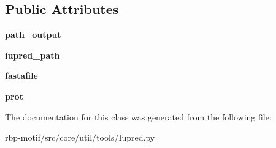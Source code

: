 \subsection*{Public Attributes}
\begin{DoxyCompactItemize}
\item 
\hypertarget{classsrc_1_1core_1_1util_1_1tools_1_1Iupred_1_1Iupred_a2b4d26412ad9a84336800751ce49adb0}{{\bfseries path\-\_\-output}}\label{classsrc_1_1core_1_1util_1_1tools_1_1Iupred_1_1Iupred_a2b4d26412ad9a84336800751ce49adb0}

\item 
\hypertarget{classsrc_1_1core_1_1util_1_1tools_1_1Iupred_1_1Iupred_adf0b98b5d9c54aa5cf1ea28d471c1147}{{\bfseries iupred\-\_\-path}}\label{classsrc_1_1core_1_1util_1_1tools_1_1Iupred_1_1Iupred_adf0b98b5d9c54aa5cf1ea28d471c1147}

\item 
\hypertarget{classsrc_1_1core_1_1util_1_1tools_1_1Iupred_1_1Iupred_a6ebe0afbd3972992a7dedc5975c809c5}{{\bfseries fastafile}}\label{classsrc_1_1core_1_1util_1_1tools_1_1Iupred_1_1Iupred_a6ebe0afbd3972992a7dedc5975c809c5}

\item 
\hypertarget{classsrc_1_1core_1_1util_1_1tools_1_1Iupred_1_1Iupred_ae64604e778dd1e3ba3ef140360da5cdb}{{\bfseries prot}}\label{classsrc_1_1core_1_1util_1_1tools_1_1Iupred_1_1Iupred_ae64604e778dd1e3ba3ef140360da5cdb}

\end{DoxyCompactItemize}


The documentation for this class was generated from the following file\-:\begin{DoxyCompactItemize}
\item 
rbp-\/motif/src/core/util/tools/Iupred.\-py\end{DoxyCompactItemize}
